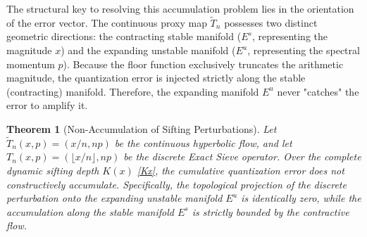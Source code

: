 \documentclass[sn-mathphys-num, pdflatex, referee]{sn-jnl}
\newtheorem{theorem}{Theorem}[section]
\begin{document}
The structural key to resolving this accumulation problem lies in the orientation of the error vector. The continuous proxy map $\tilde{T}_n$ possesses two distinct geometric directions: the contracting stable manifold ($E^s$, representing the magnitude $x$) and the expanding unstable manifold ($E^u$, representing the spectral momentum $p$). Because the floor function exclusively truncates the arithmetic magnitude, the quantization error is injected strictly along the stable (contracting) manifold. Therefore, the expanding manifold $E^u$ never "catches" the error to amplify it.

\begin{theorem}[Non-Accumulation of Sifting Perturbations]
\label{the:non_accumulation}
Let $\tilde{T}_n(x,p) = (x/n, np)$ be the continuous hyperbolic flow, and let $T_n(x,p) = (\lfloor x/n \rfloor, np)$ be the discrete Exact Sieve operator. Over the complete dynamic sifting depth $K(x)$ \ref{Kx}, the cumulative quantization error does not constructively accumulate. Specifically, the topological projection of the discrete perturbation onto the expanding unstable manifold $E^u$ is identically zero, while the accumulation along the stable manifold $E^s$ is strictly bounded by the contractive flow.
\end{theorem}
\end{document}
